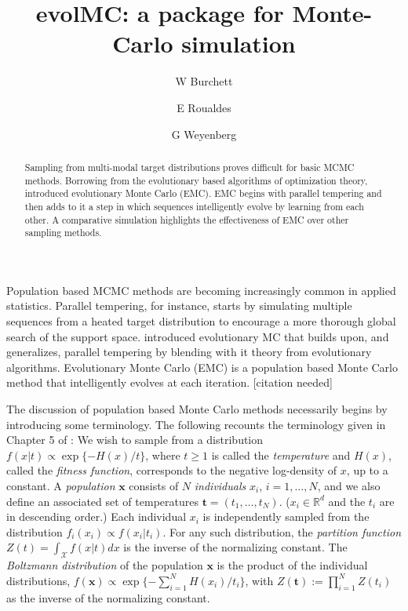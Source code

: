 \documentclass[12pt]{article}\usepackage[]{graphicx}\usepackage[]{color}
\title{evolMC: a package for Monte-Carlo simulation}
\author{W Burchett \and E Roualdes \and G Weyenberg}
\newcommand{\bx}{\mathbf x}
\newcommand{\bt}{\mathbf t}
\newcommand{\X}{\mathcal X}
\newcommand{\needcite}{{\color{red}[citation needed]}}
\begin{document}
\maketitle
\doublespacing

\begin{abstract}
  Sampling from multi-modal target distributions proves difficult for
  basic MCMC methods.  Borrowing from the evolutionary based
  algorithms of optimization theory, \cite{liang2000evolutionary}
  introduced evolutionary Monte Carlo (EMC).  EMC begins with parallel
  tempering and then adds to it a step in which sequences
  intelligently evolve by learning from each other.  A comparative
  simulation highlights the effectiveness of EMC over other sampling
  methods.
\end{abstract}

\vspace{1cm}
\label{sec:introduction}

Population based MCMC methods are becoming increasingly common in
applied statistics.  Parallel tempering, for instance, starts by
simulating multiple sequences from a heated target distribution to
encourage a more thorough global search of the support space.
\cite{liang2000evolutionary} introduced evolutionary MC that builds
upon, and generalizes, parallel tempering by blending with it theory
from evolutionary algorithms. Evolutionary Monte Carlo (EMC) is a
population based Monte Carlo method that intelligently evolves at each
iteration. \needcite

The discussion of population based Monte Carlo methods necessarily
begins by introducing some terminology. The following recounts the
terminology given in Chapter 5 of \cite{liang2011advanced}: We wish to
sample from a distribution $f(x|t) \propto \exp\{ -H(x)/t \}$, where
$t\ge 1$ is called the \emph{temperature} and $H(x)$, called the
\emph{fitness function}, corresponds to the negative log-density of
$x$, up to a constant. A \emph{population} $\mathbf{x}$ consists of
$N$ \emph{individuals} $x_i$, $i = 1, \ldots, N$, and we also define
an associated set of temperatures $\bt = (t_1,\ldots,t_N)$. ($x_i \in
\mathbb{R}^d$ and the $t_i$ are in descending order.) Each individual
$x_i$ is independently sampled from the distribution $f_i(x_i) \propto
f(x_i|t_i)$.  For any such distribution, the \emph{partition function}
$Z(t)= \int_\X f(x|t) dx$ is the inverse of the normalizing
constant. The \emph{Boltzmann distribution} of the population $\bx$ is the
product of the individual distributions, $f(\bx) \propto \exp \{ -\sum_{i=1}^N
H(x_i)/ t_i \}$, with $Z(\bt) := \prod_{i=1}^N Z(t_i)$ as the inverse
of the normalizing constant. 
\end{document}
